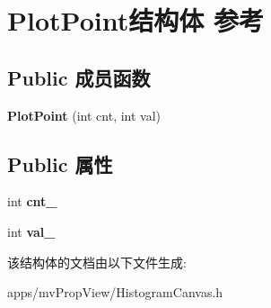 \hypertarget{struct_plot_point}{\section{Plot\+Point结构体 参考}
\label{struct_plot_point}
}
\subsection*{Public 成员函数}
\begin{DoxyCompactItemize}
\item 
\hypertarget{struct_plot_point_a1eba3889d6d734d318b6a44afb102e89}{{\bfseries Plot\+Point} (int cnt, int val)}\label{struct_plot_point_a1eba3889d6d734d318b6a44afb102e89}

\end{DoxyCompactItemize}
\subsection*{Public 属性}
\begin{DoxyCompactItemize}
\item 
\hypertarget{struct_plot_point_a41bcef9dca8ad58059c74f2fd4432d91}{int {\bfseries cnt\+\_\+}}\label{struct_plot_point_a41bcef9dca8ad58059c74f2fd4432d91}

\item 
\hypertarget{struct_plot_point_a6e09c676a6514e49624c36e646444c7e}{int {\bfseries val\+\_\+}}\label{struct_plot_point_a6e09c676a6514e49624c36e646444c7e}

\end{DoxyCompactItemize}


该结构体的文档由以下文件生成\+:\begin{DoxyCompactItemize}
\item 
apps/mv\+Prop\+View/Histogram\+Canvas.\+h\end{DoxyCompactItemize}
